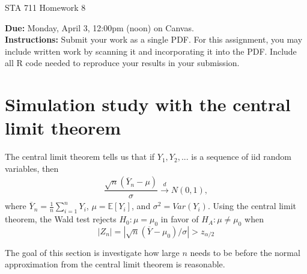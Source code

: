 \documentclass[11pt]{article}
\begin{document}
\begin{center}
\Large
STA 711 Homework 8\\
\normalsize
\vspace{5mm}
\end{center}

\noindent \textbf{Due:} Monday, April 3, 12:00pm (noon) on Canvas.\\ 

\noindent \textbf{Instructions:} Submit your work as a single PDF. For this assignment, you may include written work by scanning it and incorporating it into the PDF. Include all R code needed to reproduce your results in your submission.



\section*{Simulation study with the central limit theorem}

The central limit theorem tells us that if $Y_1, Y_2,...$ is a sequence of iid random variables, then
\begin{align*}
\dfrac{\sqrt{n}(\overline{Y}_n - \mu)}{\sigma} \overset{d}{\to} N(0, 1),
\end{align*}
where $\overline{Y}_n = \frac{1}{n} \sum \limits_{i=1}^n Y_i$, $\mu = \mathbb{E}[Y_i]$, and $\sigma^2 = Var(Y_i)$. Using the central limit theorem, the Wald test rejects $H_0: \mu = \mu_0$ in favor of $H_A: \mu \neq \mu_0$ when 
$$|Z_n| = |\sqrt{n}(\overline{Y} - \mu_0)/\sigma| > z_{\alpha/2}$$

\noindent The goal of this section is investigate how large $n$ needs to be before the normal approximation from the central limit theorem is reasonable.
\end{document}
